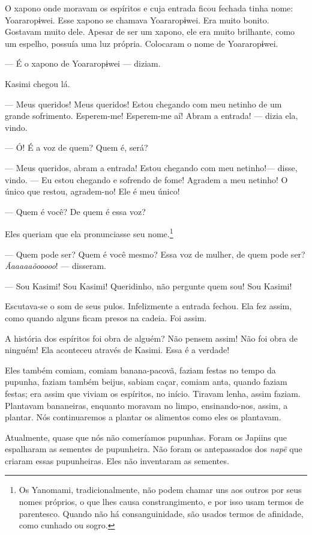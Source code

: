 O xapono onde moravam os espíritos e cuja entrada ficou fechada tinha
nome: Yoararopɨwei. Esse xapono se chamava Yoararopɨwei. Era muito
bonito. Gostavam muito dele. Apesar de ser um xapono, ele era muito
brilhante, como um espelho, possuía uma luz própria. Colocaram o nome de
Yoararopɨwei.

--- É o xapono de Yoararopɨwei --- diziam. 

Kasimi chegou lá. 

--- Meus queridos! Meus queridos! Estou chegando com meu netinho de um
grande sofrimento. Esperem-me! Esperem-me aí! Abram a entrada! --- dizia ela,
vindo.

--- Ó! É a voz de quem? Quem é, será?

--- Meus queridos, abram a entrada! Estou chegando com meu netinho!---
disse, vindo. --- Eu estou chegando e sofrendo de fome! Agradem a meu
netinho! O único que restou, agradem-no! Ele é meu único!

--- Quem é você? De quem é essa voz? 

Eles queriam que ela pronunciasse seu nome.\footnote{Os Yanomami, tradicionalmente, não podem chamar uns aos outros por seus nomes próprios, o que lhes causa constrangimento, e por isso usam termos de parentesco. Quando não há consanguinidade, são usados termos de afinidade, como cunhado ou sogro.} 

--- Quem pode ser? Quem é você mesmo? Essa voz de mulher, de quem pode
ser? \textit{Ãaaaaaõooooo}! --- disseram. 

--- Sou Kasimi! Sou Kasimi! Queridinho, não pergunte quem
sou! Sou Kasimi!

Escutava-se o som de seus pulos. Infelizmente a entrada fechou. Ela fez
assim, como quando alguns ficam presos na
cadeia. Foi assim. 

A história dos espíritos foi obra de alguém? Não pensem assim! Não foi
obra de ninguém! Ela aconteceu através de Kasimi. Essa é a verdade! 

Eles também comiam, comiam banana-pacovã, faziam festas no tempo da
pupunha, faziam também beijus, sabiam caçar, comiam anta, quando faziam
festas; era assim que viviam os espíritos, no início. Tiravam lenha,
assim faziam. Plantavam bananeiras, enquanto moravam no limpo,
ensinando-nos, assim, a plantar. Nós continuaremos a plantar os
alimentos como eles os plantavam. 

Atualmente, quase que nós não comeríamos pupunhas. Foram os Japiins que
espalharam as sementes de pupunheira. Não foram os antepassados
dos \textit{napë} que criaram essas pupunheiras. Eles não inventaram as
sementes. 


